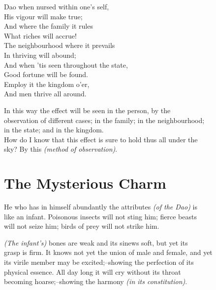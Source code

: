     Dao when nursed within one's self,\\
    His vigour will make true;\\
    And where the family it rules\\
    What riches will accrue!\\
    The neighbourhood where it prevails\\
    In thriving will abound;\\
    And when 'tis seen throughout the state,\\
    Good fortune will be found.\\
    Employ it the kingdom o'er,\\
    And men thrive all around.\vspace{\baselineskip}
    
    In this way the effect will be seen in the person, by the\\
    observation of different cases; in the family; in the neighbourhood;\\
    in the state; and in the kingdom.\\
    
    How do I know that this effect is sure to hold thus all under the\\
    sky? By this \textit{(method of observation)}.\vspace{\baselineskip}

\section*{The Mysterious Charm}
    He who has in himself abundantly the attributes \textit{(of the Dao)} is\\
    like an infant. Poisonous insects will not sting him; fierce beasts\\
    will not seize him; birds of prey will not strike him.\vspace{\baselineskip}
    
    \textit{(The infant's)} bones are weak and its sinews soft, but yet its\\
    grasp is firm. It knows not yet the union of male and female, and yet\\
    its virile member may be excited;--showing the perfection of its\\
    physical essence. All day long it will cry without its throat\\
    becoming hoarse;--showing the harmony \textit{(in its constitution)}.\vspace{\baselineskip}
    
